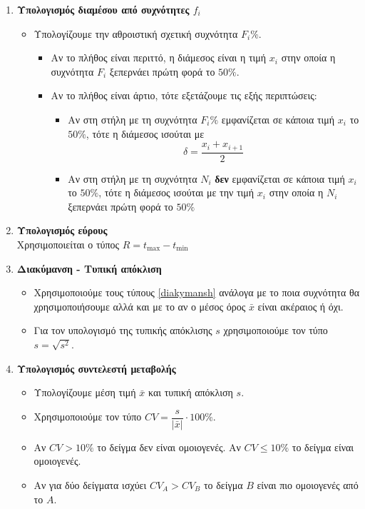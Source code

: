 \documentclass[a4paper,11pt]{article}
\begin{document}
\begin{enumerate}[label=\bf\thesection.\arabic*.]
\begin{itemize}
\begin{itemize}[leftmargin=4mm]
\begin{itemize}
\end{itemize}
\end{itemize}
\end{itemize}
\item\textbf{Υπολογισμός διαμέσου από συχνότητες $f_i$}\label{diamesos2}
\begin{itemize}
\item Υπολογίζουμε την αθροιστική σχετική συχνότητα $F_i\%$.
\begin{itemize}[leftmargin=4mm]
\item Αν το πλήθος είναι περιττό, η διάμεσος είναι η τιμή $x_i$ στην οποία η συχνότητα $F_i$ ξεπερνάει πρώτη φορά το $50\%$.
\item Αν το πλήθος είναι άρτιο, τότε εξετάζουμε τις εξής περιπτώσεις:
\begin{itemize}
\item Αν στη στήλη με τη συχνότητα $F_i\%$ εμφανίζεται σε κάποια τιμή $x_i$ το $50\%$, τότε η διάμεσος ισούται με 
\[ \delta=\frac{x_i+x_{i+1}}{2} \]
\item Αν στη στήλη με τη συχνότητα $N_i$ \textbf{δεν} εμφανίζεται σε κάποια τιμή $x_i$ το $50\%$, τότε η διάμεσος ισούται με την τιμή $x_i$ στην οποία η $N_i$ ξεπερνάει πρώτη φορά το $50\%$
\end{itemize}
\end{itemize}
\end{itemize}
\item\textbf{Υπολογισμός εύρους}\\
Χρησιμοποιείται ο τύπος $R=t_{\max}-t_{\min}$
\item\textbf{Διακύμανση - Τυπική απόκλιση}
\begin{itemize}
\item Χρησιμοποιούμε τους τύπους \ref{diakymansh} ανάλογα με το ποια συχνότητα θα χρησιμοποιήσουμε αλλά και με το αν ο μέσος όρος $\bar{x}$ είναι ακέραιος ή όχι.
\item Για τον υπολογισμό της τυπικής απόκλισης $s$ χρησιμοποιούμε τον τύπο $s=\sqrt{s^2}$.
\end{itemize}
\item\textbf{Υπολογισμός συντελεστή μεταβολής}
\begin{itemize}
\item Υπολογίζουμε μέση τιμή $\bar{x}$ και τυπική απόκλιση $s$.
\item Χρησιμοποιούμε τον τύπο $CV=\dfrac{s}{|\bar{x}|}\cdot 100\%$.
\item Αν $CV>10\%$ το δείγμα δεν είναι ομοιογενές. Αν $CV\leq 10\%$ το δείγμα είναι ομοιογενές.
\item Αν για δύο δείγματα ισχύει $CV_A>CV_B$ το δείγμα $B$ είναι πιο ομοιογενές από το $A$.

\end{itemize}
\end{enumerate}
\end{document}

